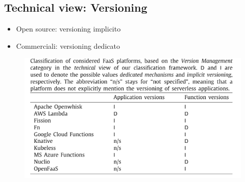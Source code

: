 \documentclass[a4paper, 12pt]{report}
\begin{document}
            \subsection{Technical view: Versioning}
            \begin{itemize}
              \item Open source: versioning implicito
              \item Commerciali: versioning dedicato
            \end{itemize}
            \begin{figure}[h]
              \centering
              \includegraphics[scale=0.5]{Immagini/Versioing.png}
            \end{figure}
\end{document}
